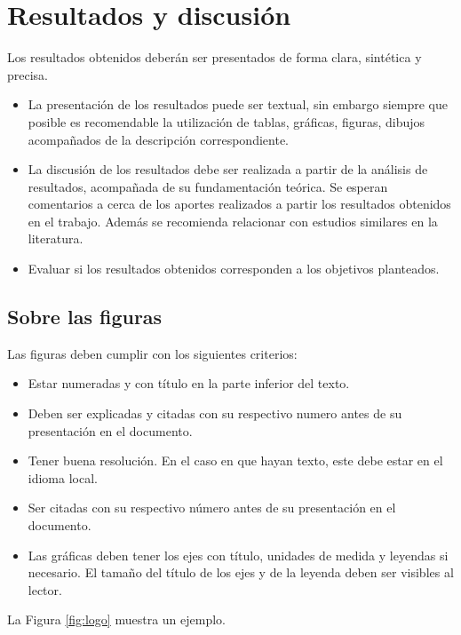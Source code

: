 \documentclass{article}[11pt]
\begin{document}
\section{Resultados y discusión}
Los resultados obtenidos deberán ser presentados de forma clara, sintética y precisa. \\
\begin{itemize}
\item La presentación de los resultados puede ser textual, sin embargo siempre que posible es recomendable la utilización de tablas, gráficas, figuras, dibujos acompañados de la descripción correspondiente.
\item La discusión de los resultados debe ser realizada a partir de la análisis de resultados, acompañada de su fundamentación teórica. Se esperan comentarios a cerca de los aportes realizados a partir los resultados obtenidos en el trabajo. Además se recomienda relacionar con estudios similares en la literatura.
\item Evaluar si los resultados obtenidos corresponden a los objetivos planteados.
\end{itemize} 

\subsection{Sobre las figuras}
Las figuras deben cumplir con los siguientes criterios: \\

\begin{itemize}
\item Estar numeradas y con título en la parte inferior del texto.
\item Deben ser explicadas y citadas con su respectivo numero antes de su presentación en el documento. 
\item Tener buena resolución. En el caso en que hayan texto, este debe estar en el idioma local.
\item Ser citadas con su respectivo número antes de su presentación en el documento. 
\item Las gráficas deben tener los ejes con título, unidades de medida y leyendas si necesario. El tamaño del título de los ejes y de la leyenda deben ser visibles al lector.\\
\end{itemize} 

La Figura \ref{fig:logo} muestra un ejemplo.
\end{document}
